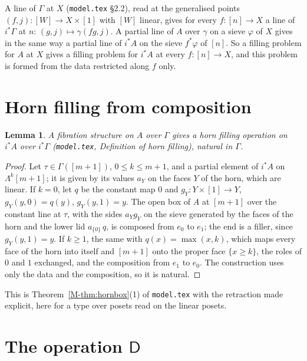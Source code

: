 \documentclass[11pt]{article}
\newcommand{\D}{\mathsf{D}}
\newcommand{\Lam}{\Lambda}
\theoremstyle{plain}
\newtheorem{lemma}[theorem]{Lemma}
\theoremstyle{definition}
\theoremstyle{remark}
\begin{document}
A line of $\Gamma$ at $X$ (\texttt{model.tex} §2.2), read at the generalised
points $(f,j):[W]\to X\times[1]$ with $[W]$ linear, gives for every
$f:[n]\to X$ a line of $i^*\Gamma$ at $n$: $(g,j)\mapsto\gamma(fg,j)$. A
partial line of $A$ over $\gamma$ on a sieve $\varphi$ of $X$ gives in the
same way a partial line of $i^*A$ on the sieve $f^*\varphi$ of $[n]$. So a
filling problem for $A$ at $X$ gives a filling problem for $i^*A$ at every
$f:[n]\to X$, and this problem is formed from the data restricted along $f$
only.

\section{Horn filling from composition}\label{sec:horn}

\begin{lemma}\label{lem:comp-horn}
A fibration structure on $A$ over $\Gamma$ gives a horn filling operation on
$i^*A$ over $i^*\Gamma$ (\texttt{model.tex}, Definition of horn filling),
natural in $\Gamma$.
\end{lemma}

\begin{proof}
Let $\tau\in\Gamma([m+1])$, $0\le k\le m+1$, and a partial element of $i^*A$
on $\Lam^k[m+1]$; it is given by its values $a_Y$ on the faces $Y$ of the
horn, which are linear. If $k=0$, let $q$ be the constant map $0$ and
$g_Y:Y\times[1]\to Y$, $g_Y(y,0)=q(y)$, $g_Y(y,1)=y$. The open box of $A$ at
$[m+1]$ over the constant line at $\tau$, with the sides $a_Y g_Y$ on the
sieve generated by the faces of the horn and the lower lid $a_{\{0\}}\,q$, is
composed from $e_0$ to $e_1$; the end is a filler, since $g_Y(y,1)=y$. If
$k\ge1$, the same with $q(x)=\max(x,k)$, which maps every face of the horn
into itself and $[m+1]$ onto the proper face $\{x\ge k\}$, the roles of $0$
and $1$ exchanged, and the composition from $e_1$ to $e_0$. The construction uses only the
data and the composition, so it is natural.
\end{proof}

This is Theorem~\ref{M-thm:hornbox}(1) of \texttt{model.tex} with the
retraction made explicit, here for a type over posets read on the linear
posets.

\section{The operation $\D$}\label{sec:D}
\end{document}

